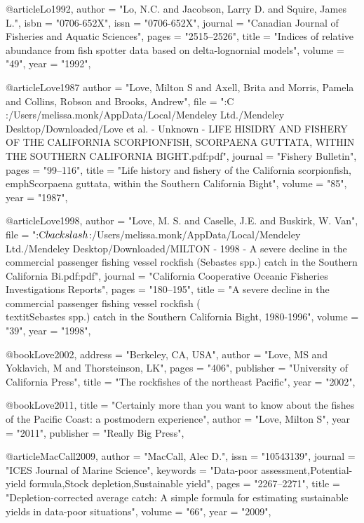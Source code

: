 {@article{Lo1992,
    author = "{Lo, N.C. and Jacobson, Larry D. and Squire, James L.}",
    isbn = "{0706-652X}",
    issn = "{0706-652X}",
    journal = "{Canadian Journal of Fisheries and Aquatic Sciences}",
    pages = "{2515--2526}",
    title = "{{Indices of relative abundance from fish spotter data based on delta-lognornial models}}",
    volume = "{49}",
    year = "{1992}",
}


@article{Love1987
    author = "{Love, Milton S and Axell, Brita and Morris, Pamela and Collins, Robson and Brooks, Andrew}",
    file = "{:C\\:/Users/melissa.monk/AppData/Local/Mendeley Ltd./Mendeley Desktop/Downloaded/Love et al. - Unknown - LIFE HISIDRY AND FISHERY OF THE CALIFORNIA SCORPIONFISH, SCORPAENA GUTTATA, WITHIN THE SOUTHERN CALIFORNIA BIGHT.pdf:pdf}",
    journal = "{Fishery Bulletin}",
    pages = "{99--116}",
    title = "{{Life history and fishery of the California scorpionfish, \\emph{Scorpaena guttata}, within the Southern California Bight}}",
    volume = "{85}",
    year = "{1987}",
}

@article{Love1998,
    author = "{Love, M. S. and Caselle, J.E. and Buskirk, W. Van}",
    file = "{:C$\\backslash$:/Users/melissa.monk/AppData/Local/Mendeley Ltd./Mendeley Desktop/Downloaded/MILTON - 1998 - A severe decline in the commercial passenger fishing vessel rockfish (Sebastes spp.) catch in the Southern California Bi.pdf:pdf}",
    journal = "{California Cooperative Oceanic Fisheries Investigations Reports}",
    pages = "{180--195}",
    title = "{{A severe decline in the commercial passenger fishing vessel rockfish (\\textit{{Sebastes}} spp.) catch in the Southern California Bight, 1980-1996}}",
    volume = "{39}",
    year = "{1998}",
}

@book{Love2002,
    address = "{Berkeley, CA, USA}",
    author = "{Love, MS and Yoklavich, M and Thorsteinson, LK}",
    pages = "{406}",
    publisher = "{University of California Press}",
    title = "{{The rockfishes of the northeast Pacific}}",
    year = "{2002}",
}

@book{Love2011,
    title = "{Certainly more than you want to know about the fishes of the Pacific Coast: a postmodern experience}",
    author = "{Love, Milton S}",
    year = "{2011}",
    publisher = "{Really Big Press}",
}

@article{MacCall2009,
    author = "{MacCall, Alec D.}",
    issn = "{10543139}",
    journal = "{ICES Journal of Marine Science}",
    keywords = "{Data-poor assessment,Potential-yield formula,Stock depletion,Sustainable yield}",
    pages = "{2267--2271}",
    title = "{{Depletion-corrected average catch: A simple formula for estimating sustainable yields in data-poor situations}}",
    volume = "{66}",
    year = "{2009}",
}

}
